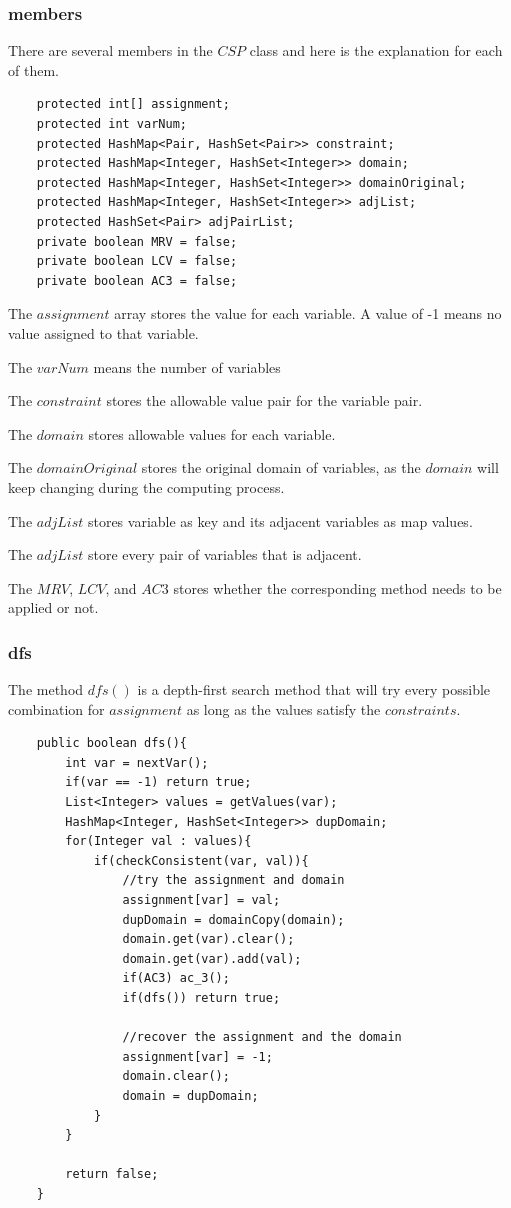 \documentclass{article}
\begin{document}
\subsubsection{members}
There are several members in the $CSP$ class and here is the explanation for each of them.
\begin{lstlisting}
	protected int[] assignment;
	protected int varNum;
	protected HashMap<Pair, HashSet<Pair>> constraint;
	protected HashMap<Integer, HashSet<Integer>> domain;
	protected HashMap<Integer, HashSet<Integer>> domainOriginal;
	protected HashMap<Integer, HashSet<Integer>> adjList;
	protected HashSet<Pair> adjPairList;
	private boolean MRV = false;
	private boolean LCV = false;
	private boolean AC3 = false;
\end{lstlisting}
\begin{flushleft}
The $assignment$ array stores the value for each variable. A value of -1 means no value assigned to that variable.

The $varNum$ means the number of variables

The $constraint$ stores the allowable value pair for the variable pair.

The $domain$ stores allowable values for each variable.

The $domainOriginal$ stores the original domain of variables, as the $domain$ will keep changing during the computing process.

The $adjList$ stores variable as key and its adjacent variables as map values.

The $adjList$ store every pair of variables that is adjacent.

The $MRV$, $LCV$, and $AC3$ stores whether the corresponding method needs to be applied or not.
\end{flushleft}

\subsubsection{dfs}
The method $dfs()$ is a depth-first search method that will try every possible combination for $assignment$ as long as the values satisfy the $constraints$.
\begin{lstlisting}
	public boolean dfs(){	
		int var = nextVar();
		if(var == -1) return true;
		List<Integer> values = getValues(var);
		HashMap<Integer, HashSet<Integer>> dupDomain;
		for(Integer val : values){
			if(checkConsistent(var, val)){
				//try the assignment and domain
				assignment[var] = val;
				dupDomain = domainCopy(domain);
				domain.get(var).clear();
				domain.get(var).add(val);
				if(AC3) ac_3();
				if(dfs()) return true;
				
				//recover the assignment and the domain
				assignment[var] = -1;
				domain.clear();
				domain = dupDomain;
			}
		}
		
		return false;
	}
\end{lstlisting}
\end{document}
